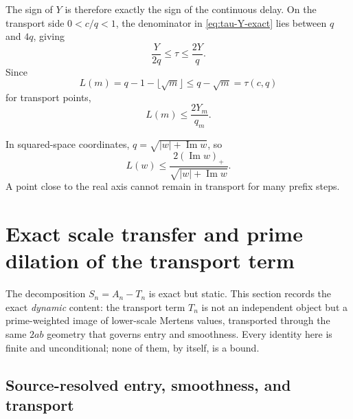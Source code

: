 \documentclass[11pt]{article}
\theoremstyle{definition}
\newcommand{\1}{\mathbf{1}}
\newcommand{\Impart}{\operatorname{Im}}
\begin{document}
The sign of $Y$ is therefore exactly the sign of the continuous delay.  On the transport side $0<c/q<1$, the denominator in \cref{eq:tau-Y-exact} lies between $q$ and $4q$, giving
\begin{equation}
 \frac{Y}{2q}
 \le\tau
 \le\frac{2Y}{q}.
 \label{eq:tau-bounds}
\end{equation}
Since
\begin{equation}
 L(m)=q-1-\lfloor\sqrt m\rfloor
 \le q-\sqrt m=\tau(c,q)
 \label{eq:L-tau}
\end{equation}
for transport points,
\begin{equation}
 \boxed{L(m)\le\frac{2Y_m}{q_m}.}
 \label{eq:L-Y}
\end{equation}

In squared-space coordinates, $q=\sqrt{|w|+\Impart w}$, so
\begin{equation}
 L(w)
 \le
 \frac{2(\Impart w)_+}
 {\sqrt{|w|+\Impart w}}.
 \label{eq:L-w}
\end{equation}
A point close to the real axis cannot remain in transport for many prefix steps.


\section{Exact scale transfer and prime dilation of the transport term}
\label{sec:scale-transfer}

The decomposition $S_n=A_n-T_n$ is exact but static.  This section records the exact \emph{dynamic} content: the transport term $T_n$ is not an independent object but a prime-weighted image of lower-scale Mertens values, transported through the same $2ab$ geometry that governs entry and smoothness.  Every identity here is finite and unconditional; none of them, by itself, is a bound.

\subsection{Source-resolved entry, smoothness, and transport}
\end{document}

